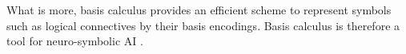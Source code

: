 What is more, basis calculus provides an efficient scheme to represent symbols such as logical connectives by their basis encodings.
Basis calculus is therefore a tool for neuro-symbolic AI \cite{garcez_neural-symbolic_2019, sarker_neuro-symbolic_2022, marra_statistical_2024}.



